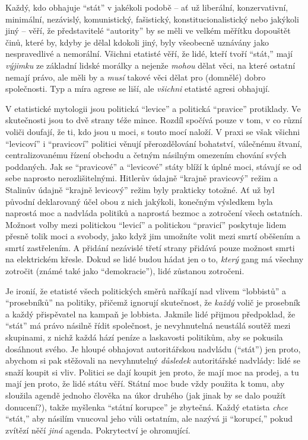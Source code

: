 \documentclass{book}
\begin{document}
Každý, kdo obhajuje \enquote{stát} v jakékoli podobě -- ať už liberální, konzervativní, minimální, nezávislý, komunistický, fašistický, konstitucionalistický nebo jakýkoli jiný -- věří, že představitelé \enquote{autority} by se měli ve velkém měřítku dopouštět činů, které by, kdyby je dělal kdokoli jiný, byly všeobecně uznávány jako nespravedlivé a nemorální. Všichni etatisté věří, že lidé, kteří tvoří \enquote{stát,} mají \emph{výjimku} ze základní lidské morálky a nejenže \emph{mohou} dělat věci, na které ostatní nemají právo, ale měli by a \emph{musí} takové věci dělat pro (domnělé) dobro společnosti. Typ a míra agrese se liší, ale \emph{všichni} etatisté agresi obhajují.

V etatistické mytologii jsou politická \enquote{levice} a politická \enquote{pravice} protiklady. Ve skutečnosti jsou to dvě strany téže mince. Rozdíl spočívá pouze v tom, v co různí voliči doufají, že ti, kdo jsou u moci, s touto mocí naloží. V praxi se však všichni \enquote{levicoví} i \enquote{pravicoví} politici věnují přerozdělování bohatství, válečnému štvaní, centralizovanému řízení obchodu a četným násilným omezením chování svých poddaných. Jak se \enquote{pravicové} a \enquote{levicové} státy blíží k úplné moci, stávají se od sebe naprosto nerozlišitelnými. Hitlerův údajně \enquote{krajně pravicový} režim a Stalinův údajně \enquote{krajně levicový} režim byly prakticky totožné. Ať už byl původní deklarovaný účel obou z nich jakýkoli, konečným výsledkem byla naprostá moc a nadvláda politiků a naprostá bezmoc a zotročení všech ostatních. Možnost volby mezi politickou \enquote{levicí} a politickou \enquote{pravicí} poskytuje lidem přesně tolik moci a svobody, jako když jim umožníte volit mezi smrtí oběšením a smrtí zastřelením. A přidání nezávislé třetí strany přidává pouze možnost smrti na elektrickém křesle. Dokud se lidé budou hádat jen o to, \emph{který} gang má všechny zotročit (známé také jako \enquote{demokracie}), lidé zůstanou zotročeni.

Je ironií, že etatisté všech politických směrů naříkají nad vlivem \enquote{lobbistů} a \enquote{prosebníků} na politiky, přičemž ignorují skutečnost, že \emph{každý} volič je prosebník a každý přispěvatel na kampaň je lobbista. Jakmile lidé přijmou předpoklad, že \enquote{stát} má právo násilně řídit společnost, je nevyhnutelná neustálá soutěž mezi skupinami, z nichž každá hází peníze a laskavosti politikům, aby se pokusila dosáhnout svého. Je hloupé obhajovat autoritářskou nadvládu (\enquote{stát}) jen proto, abychom si pak stěžovali na nevyhnutelný \emph{důsledek} autoritářské nadvlády: lidé se snaží koupit si vliv. Politici se dají koupit jen proto, že mají moc na prodej, a tu mají jen proto, že lidé státu věří. Státní moc bude vždy použita k tomu, aby sloužila agendě jednoho člověka na úkor druhého (jak jinak by se dalo použít donucení?), takže myšlenka \enquote{státní korupce} je zbytečná. Každý etatista \emph{chce} \enquote{stát,} aby násilím vnucoval jeho vůli ostatním, ale nazývá ji \enquote{korupcí,} pokud zvítězí něčí \emph{jiná} agenda. Pokrytectví je ohromující.
\end{document}
